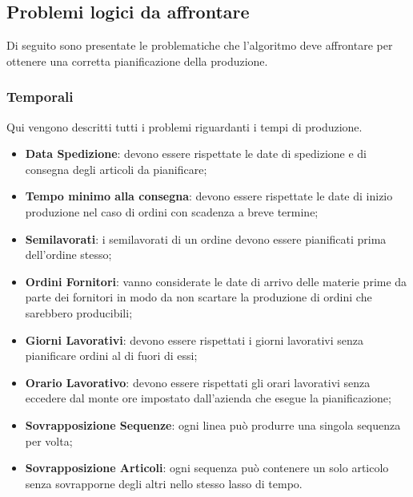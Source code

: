 \subsection{Problemi logici da affrontare}
Di seguito sono presentate le problematiche che l'algoritmo deve affrontare per ottenere una corretta pianificazione della produzione.

\subsubsection{Temporali}
Qui vengono descritti tutti i problemi riguardanti i tempi di produzione.
\begin{itemize}
	\item \textbf{Data Spedizione}: devono essere rispettate le date di spedizione e di consegna degli articoli da pianificare;
	\item \textbf{Tempo minimo alla consegna}: devono essere rispettate le date di inizio produzione nel caso di ordini con scadenza a breve termine;
	
	\item \textbf{Semilavorati}: i semilavorati di un ordine devono essere pianificati prima dell'ordine stesso;
	
	\item \textbf{Ordini Fornitori}: vanno considerate le date di arrivo delle materie prime da parte dei fornitori in modo da non scartare la produzione di ordini che sarebbero producibili;
	
	\item \textbf{Giorni Lavorativi}: devono essere rispettati i giorni lavorativi senza pianificare ordini al di fuori di essi;
	\item \textbf{Orario Lavorativo}: devono essere rispettati gli orari lavorativi senza eccedere dal monte ore impostato dall'azienda che esegue la pianificazione;
	\item \textbf{Sovrapposizione Sequenze}: ogni linea può produrre una singola sequenza per volta;	
	\item \textbf{Sovrapposizione Articoli}: ogni sequenza può contenere un solo articolo senza sovrapporne degli altri nello stesso lasso di tempo.
\end{itemize}

